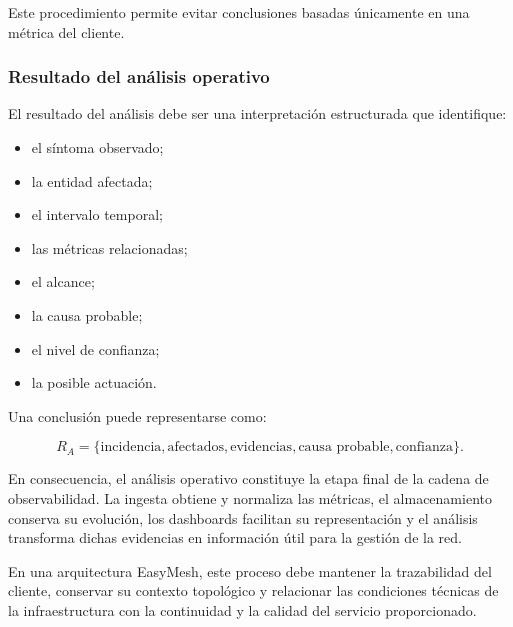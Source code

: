 Este procedimiento permite evitar conclusiones basadas únicamente en una
métrica del cliente.


\subsubsection*{Resultado del análisis operativo}

El resultado del análisis debe ser una interpretación estructurada que
identifique:

\begin{itemize}
    \item el síntoma observado;

    \item la entidad afectada;

    \item el intervalo temporal;

    \item las métricas relacionadas;

    \item el alcance;

    \item la causa probable;

    \item el nivel de confianza;

    \item la posible actuación.
\end{itemize}

Una conclusión puede representarse como:

\[
    R_A
    =
    \{
        \text{incidencia},
        \text{afectados},
        \text{evidencias},
        \text{causa probable},
        \text{confianza}
    \}.
\]

En consecuencia, el análisis operativo constituye la etapa final de la
cadena de observabilidad. La ingesta obtiene y normaliza las métricas, el
almacenamiento conserva su evolución, los dashboards facilitan su
representación y el análisis transforma dichas evidencias en información
útil para la gestión de la red.

En una arquitectura EasyMesh, este proceso debe mantener la trazabilidad
del cliente, conservar su contexto topológico y relacionar las
condiciones técnicas de la infraestructura con la continuidad y la
calidad del servicio proporcionado.